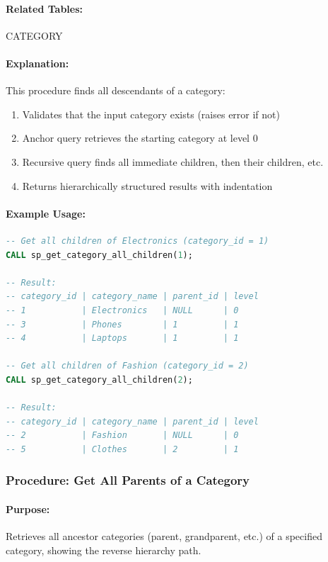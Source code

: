 \paragraph{Related Tables:} CATEGORY

\paragraph{Explanation:}
This procedure finds all descendants of a category:
\begin{enumerate}
    \item Validates that the input category exists (raises error if not)
    \item Anchor query retrieves the starting category at level 0
    \item Recursive query finds all immediate children, then their children, etc.
    \item Returns hierarchically structured results with indentation
\end{enumerate}

\paragraph{Example Usage:}

\begin{lstlisting}[language=SQL]
-- Get all children of Electronics (category_id = 1)
CALL sp_get_category_all_children(1);

-- Result:
-- category_id | category_name | parent_id | level
-- 1           | Electronics   | NULL      | 0
-- 3           | Phones        | 1         | 1
-- 4           | Laptops       | 1         | 1

-- Get all children of Fashion (category_id = 2)
CALL sp_get_category_all_children(2);

-- Result:
-- category_id | category_name | parent_id | level
-- 2           | Fashion       | NULL      | 0
-- 5           | Clothes       | 2         | 1
\end{lstlisting}

\subsubsection{Procedure: Get All Parents of a Category}

\paragraph{Purpose:} Retrieves all ancestor categories (parent, grandparent, etc.) of a specified category, showing the reverse hierarchy path.

